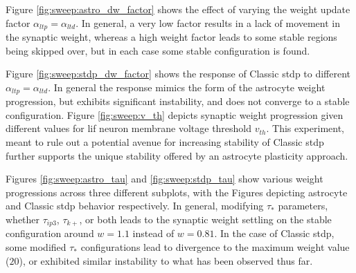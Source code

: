 
Figure \ref{fig:sweep:astro_dw_factor} shows the effect of varying the weight
update factor $\alpha_{ltp}=\alpha_{ltd}$. In general, a very low factor results
in a lack of movement in the synaptic weight, whereas a high weight factor leads
to some stable regions being skipped over, but in each case some stable
configuration is found.



Figure \ref{fig:sweep:stdp_dw_factor} shows the response of Classic \gls{stdp} to
different $\alpha_{ltp}=\alpha_{ltd}$. In general the response mimics the form
of the astrocyte weight progression, but exhibits significant instability, and
does not converge to a stable configuration. Figure \ref{fig:sweep:v_th} depicts
synaptic weight progression given different values for \gls{lif} neuron membrane
voltage threshold $v_{th}$. This experiment, meant to rule out a potential
avenue for increasing stability of Classic \gls{stdp} further supports the unique
stability offered by an astrocyte plasticity approach.


Figures \ref{fig:sweep:astro_tau} and \ref{fig:sweep:stdp_tau} show various
weight progressions across three different subplots, with the Figures
depicting astrocyte and Classic \gls{stdp} behavior respectively. In general,
modifying $\tau_*$ parameters, whether $\tau_{ip3}$, $\tau_{k+}$, or both leads
to the synaptic weight settling on the stable configuration around $w=1.1$
instead of $w=0.81$. In the case of Classic \gls{stdp}, some modified $\tau_*$
configurations lead to divergence to the maximum weight value ($20$), or
exhibited similar instability to what has been observed thus far.


